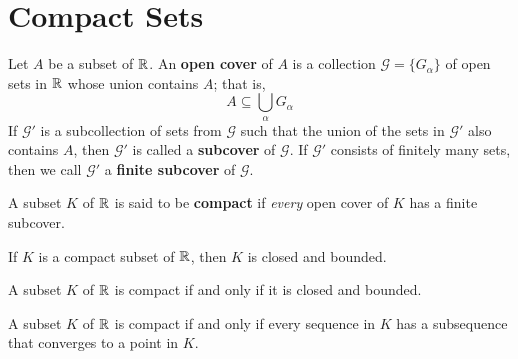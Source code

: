 \section{Compact Sets}

\begin{definition}
	Let $A$ be a subset of $\mathbb{R}$. An \textbf{open cover} of $A$ is a collection $\mathcal{G}=\{G_\alpha\}$ of open sets in $\mathbb{R}$ whose union contains $A$; that is,
	\[A \subseteq \bigcup_\alpha G_\alpha\]
	If $\mathcal{G}'$ is a subcollection of sets from $\mathcal{G}$ such that the union of the sets in $\mathcal{G}'$ also contains $A$, then $\mathcal{G}'$ is called a \textbf{subcover} of $\mathcal{G}$. If $\mathcal{G}'$ consists of finitely many sets, then we call $\mathcal{G}'$ a \textbf{finite subcover} of $\mathcal{G}$.
\end{definition}

\begin{definition}
	A subset $K$ of $\mathbb{R}$ is said to be \textbf{compact} if \textit{every} open cover of $K$ has a finite subcover.
\end{definition}

\begin{theorem}
	If $K$ is a compact subset of $\mathbb{R}$, then $K$ is closed and bounded.
\end{theorem}

\begin{theorem}
	A subset $K$ of $\mathbb{R}$ is compact if and only if it is closed and bounded.
\end{theorem}

\begin{theorem}
	A subset $K$ of $\mathbb{R}$ is compact if and only if every sequence in $K$ has a subsequence that converges to a point in $K$.
\end{theorem}

